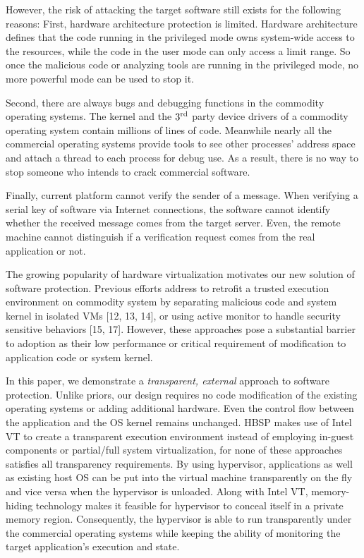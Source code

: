 \documentclass[conference]{IEEEtran}
\begin{document}
However, the risk of attacking the target software still exists
for the following reasons: First, hardware architecture protection
is limited. Hardware architecture defines that the code running in
the privileged mode owns system-wide access to the resources,
while the code in the user mode can only access a limit
range\cite{IEEEhowto:21}. So once the malicious code or analyzing
tools are running in the privileged mode, no more powerful mode
can be used to stop it.

Second, there are always bugs and debugging functions in the
commodity operating systems. The kernel and the $\text3^\text{rd}$
party device drivers of a commodity operating system contain
millions of lines of code\cite{IEEEhowto:7}. Meanwhile nearly all
the commercial operating systems provide tools to see other
processes' address space and attach a thread to each process for
debug use. As a result, there is no way to stop someone who
intends to crack commercial software.

Finally, current platform cannot verify the sender of a message.
When verifying a serial key of software via Internet connections,
the software cannot identify whether the received message comes
from the target server. Even, the remote machine cannot
distinguish if a verification request comes from the real
application or not.

The growing popularity of hardware virtualization motivates our
new solution of software protection. Previous efforts address to
retrofit a trusted execution environment on commodity system by
separating malicious code and system kernel in isolated VMs [12,
13, 14], or using active monitor to handle security sensitive
behaviors [15, 17]. However, these approaches pose a substantial
barrier to adoption as their low performance or critical
requirement of modification to application code or system kernel.

In this paper, we demonstrate a \emph{transparent, external}
approach to software protection. Unlike priors, our design
requires no code modification of the existing operating systems or
adding additional hardware. Even the control flow between the
application and the OS kernel remains unchanged. HBSP makes use of
Intel VT to create a transparent execution environment instead of
employing in-guest components or partial/full system
virtualization, for none of these approaches satisfies all
transparency requirements. By using hypervisor, applications as
well as existing host OS can be put into the virtual machine
transparently on the fly and vice versa when the hypervisor is
unloaded. Along with Intel VT, memory-hiding technology makes it
feasible for hypervisor to conceal itself in a private memory
region. Consequently, the hypervisor is able to run transparently
under the commercial operating systems while keeping the ability
of monitoring the target application's execution and state.
\end{document}
